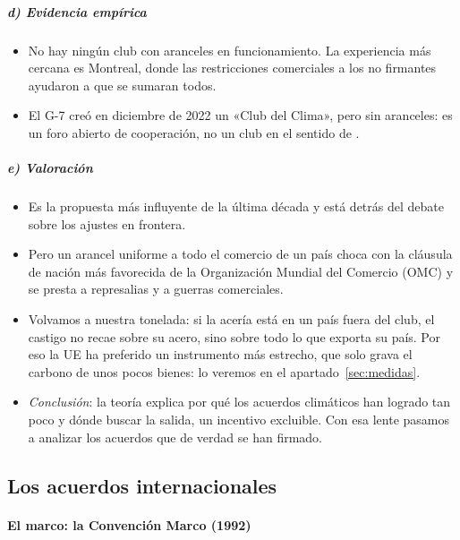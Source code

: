 \documentclass[11pt]{article}
\begin{document}
\subparagraph{d) Evidencia empírica}

\begin{itemize}
\item No hay ningún club con aranceles en funcionamiento. La experiencia más cercana es Montreal, donde las restricciones comerciales a los no firmantes ayudaron a que se sumaran todos\nocite{Barrett2003Environment}.
\item El G-7 creó en diciembre de 2022 un «Club del Clima»\nocite{G72022ClimateClub}, pero sin aranceles: es un foro abierto de cooperación, no un club en el sentido de  .
\end{itemize}

\subparagraph{e) Valoración}

\begin{itemize}
\item Es la propuesta más influyente de la última década y está detrás del debate sobre los ajustes en frontera.
\item Pero un arancel uniforme a todo el comercio de un país choca con la cláusula de nación más favorecida de la Organización Mundial del Comercio (OMC)  y se presta a represalias y a guerras comerciales.
\item Volvamos a nuestra tonelada: si la acería está en un país fuera del club, el castigo no recae sobre su acero, sino sobre todo lo que exporta su país. Por eso la UE ha preferido un instrumento más estrecho, que solo grava el carbono de unos pocos bienes: lo veremos en el apartado~\ref{sec:medidas}.
\item \emph{Conclusión}: la teoría explica por qué los acuerdos climáticos han logrado tan poco y dónde buscar la salida, un incentivo excluible. Con esa lente pasamos a analizar los acuerdos que de verdad se han firmado.
\end{itemize}

\subsection{Los acuerdos internacionales}\label{sec:acuerdos}

\paragraph{El marco: la Convención Marco (1992)}
\end{document}

